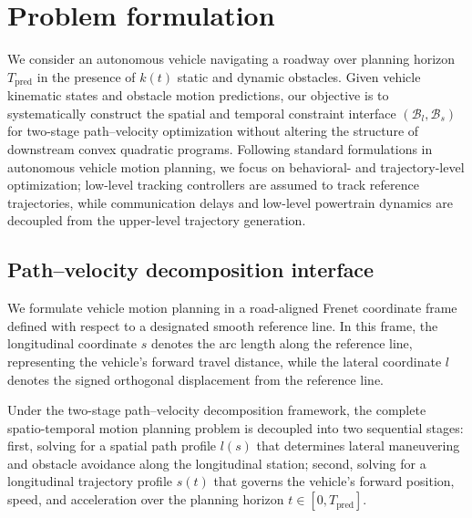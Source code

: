 \section{Problem formulation}
\label{sec:problem}

We consider an autonomous vehicle navigating a roadway over planning horizon $T_{\mathrm{pred}}$ in the presence of $k(t)$ static and dynamic obstacles. Given vehicle kinematic states and obstacle motion predictions, our objective is to systematically construct the spatial and temporal constraint interface $(\mathcal{B}_l,\mathcal{B}_s)$ for two-stage path--velocity optimization without altering the structure of downstream convex quadratic programs. Following standard formulations in autonomous vehicle motion planning, we focus on behavioral- and trajectory-level optimization; low-level tracking controllers are assumed to track reference trajectories, while communication delays and low-level powertrain dynamics are decoupled from the upper-level trajectory generation.

\subsection{Path--velocity decomposition interface}

We formulate vehicle motion planning in a road-aligned Frenet coordinate frame defined with respect to a designated smooth reference line. In this frame, the longitudinal coordinate $s$ denotes the arc length along the reference line, representing the vehicle's forward travel distance, while the lateral coordinate $l$ denotes the signed orthogonal displacement from the reference line.

Under the two-stage path--velocity decomposition framework, the complete spatio-temporal motion planning problem is decoupled into two sequential stages:
first, solving for a spatial path profile $l(s)$ that determines lateral maneuvering and obstacle avoidance along the longitudinal station;
second, solving for a longitudinal trajectory profile $s(t)$ that governs the vehicle's forward position, speed, and acceleration over the planning horizon $t \in [0, T_{\mathrm{pred}}]$.

